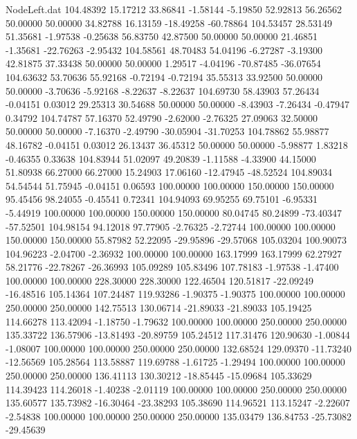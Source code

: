 \begin{filecontents}{NodeLeft.dat}
 104.48392   15.17212   33.86841    -1.58144   -5.19850   52.92813   56.26562   50.00000   50.00000   34.82788   16.13159  -18.49258  -60.78864
 104.53457   28.53149   51.35681    -1.97538   -0.25638   56.83750   42.87500   50.00000   50.00000   21.46851   -1.35681  -22.76263   -2.95432
 104.58561   48.70483   54.04196    -6.27287   -3.19300   42.81875   37.33438   50.00000   50.00000    1.29517   -4.04196  -70.87485  -36.07654
 104.63632   53.70636   55.92168    -0.72194   -0.72194   35.55313   33.92500   50.00000   50.00000   -3.70636   -5.92168   -8.22637   -8.22637
 104.69730   58.43903   57.26434    -0.04151    0.03012   29.25313   30.54688   50.00000   50.00000   -8.43903   -7.26434   -0.47947    0.34792
 104.74787   57.16370   52.49790    -2.62000   -2.76325   27.09063   32.50000   50.00000   50.00000   -7.16370   -2.49790  -30.05904  -31.70253
 104.78862   55.98877   48.16782    -0.04151    0.03012   26.13437   36.45312   50.00000   50.00000   -5.98877    1.83218   -0.46355    0.33638
 104.83944   51.02097   49.20839    -1.11588   -4.33900   44.15000   51.80938   66.27000   66.27000   15.24903   17.06160  -12.47945  -48.52524
 104.89034   54.54544   51.75945    -0.04151    0.06593  100.00000  100.00000  150.00000  150.00000   95.45456   98.24055   -0.45541    0.72341
 104.94093   69.95255   69.75101    -6.95331   -5.44919  100.00000  100.00000  150.00000  150.00000   80.04745   80.24899  -73.40347  -57.52501
 104.98154   94.12018   97.77905    -2.76325   -2.72744  100.00000  100.00000  150.00000  150.00000   55.87982   52.22095  -29.95896  -29.57068
 105.03204  100.90073  104.96223    -2.04700   -2.36932  100.00000  100.00000  163.17999  163.17999   62.27927   58.21776  -22.78267  -26.36993
 105.09289  105.83496  107.78183    -1.97538   -1.47400  100.00000  100.00000  228.30000  228.30000  122.46504  120.51817  -22.09249  -16.48516
 105.14364  107.24487  119.93286    -1.90375   -1.90375  100.00000  100.00000  250.00000  250.00000  142.75513  130.06714  -21.89033  -21.89033
 105.19425  114.66278  113.42094    -1.18750   -1.79632  100.00000  100.00000  250.00000  250.00000  135.33722  136.57906  -13.81493  -20.89759
 105.24512  117.31476  120.90630    -1.00844   -1.08007  100.00000  100.00000  250.00000  250.00000  132.68524  129.09370  -11.73240  -12.56569
 105.28564  113.58887  119.69788    -1.61725   -1.29494  100.00000  100.00000  250.00000  250.00000  136.41113  130.30212  -18.85445  -15.09684
 105.33629  114.39423  114.26018    -1.40238   -2.01119  100.00000  100.00000  250.00000  250.00000  135.60577  135.73982  -16.30464  -23.38293
 105.38690  114.96521  113.15247    -2.22607   -2.54838  100.00000  100.00000  250.00000  250.00000  135.03479  136.84753  -25.73082  -29.45639

\end{filecontents}
